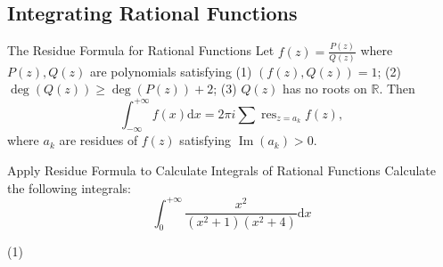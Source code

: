 \subsection{Integrating Rational Functions}

\begin{proposition}{The Residue Formula for Rational Functions}{}
  Let $f(z) = \frac{P(z)}{Q(z)}$ where $P(z), Q(z)$ are polynomials satisfying
  (1) $(f(z), Q(z)) = 1$;
  (2) $\operatorname{deg}(Q(z)) \geq \operatorname{deg}(P(z)) + 2$;
  (3) $Q(z)$ has no roots on $\mathbb{R}$.
  Then 
  \begin{equation}
    \int_{-\infty}^{+\infty} f(x) \mathrm{d} x
    = 2\pi i \sum \operatorname{res}_{z = a_k}f(z),
  \end{equation}
  where $a_k$ are residues of $f(z)$ satisfying $\operatorname{Im}(a_k) > 0$.
\end{proposition}

\begin{example}{Apply Residue Formula to Calculate Integrals of Rational Functions}{}
  Calculate the following integrals:
  \begin{equation}
    \int_0^{+\infty} \frac{x^2}{(x^2 + 1)(x^2 + 4)}\mathrm{d} x
  \end{equation}
\end{example}

\begin{solution}
  (1) 
\end{solution}


